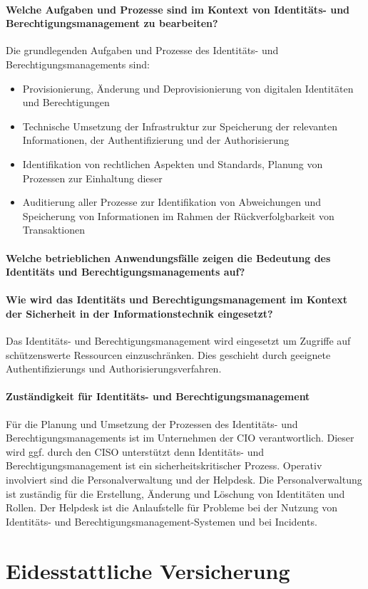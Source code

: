 \documentclass[11pt]{article}
\begin{document}
\paragraph{Welche Aufgaben und Prozesse sind im Kontext von Identitäts- und Berechtigungsmanagement zu bearbeiten?}
Die grundlegenden Aufgaben und Prozesse des Identitäts- und Berechtigungsmanagements sind:
\begin{itemize}
  \item Provisionierung, Änderung und Deprovisionierung von digitalen Identitäten und Berechtigungen
  \item Technische Umsetzung der Infrastruktur zur Speicherung der relevanten Informationen, der Authentifizierung und der Authorisierung
  \item Identifikation von rechtlichen Aspekten und Standards, Planung von Prozessen zur Einhaltung dieser
  \item Auditierung aller Prozesse zur Identifikation von Abweichungen und Speicherung von Informationen im Rahmen der Rückverfolgbarkeit von Transaktionen
\end{itemize}
\paragraph{Welche betrieblichen Anwendungsfälle zeigen die Bedeutung des Identitäts und Berechtigungsmanagements auf?}
\paragraph{Wie wird das Identitäts und Berechtigungsmanagement im Kontext der Sicherheit in der Informationstechnik eingesetzt?}
Das Identitäts- und Berechtigungsmanagement wird eingesetzt um Zugriffe auf schützenswerte Ressourcen einzuschränken. Dies geschieht durch geeignete Authentifizierungs und Authorisierungsverfahren.
\paragraph{Zuständigkeit für Identitäts- und Berechtigungsmanagement}
Für die Planung und Umsetzung der Prozessen des Identitäts- und Berechtigungsmanagements ist im Unternehmen der CIO verantwortlich. Dieser wird ggf. durch den CISO unterstützt denn Identitäts- und Berechtigungsmanagement ist ein sicherheitskritischer Prozess. Operativ involviert sind die Personalverwaltung und der Helpdesk. Die Personalverwaltung ist zuständig für die Erstellung, Änderung und Löschung von Identitäten und Rollen. Der Helpdesk ist die Anlaufstelle für Probleme bei der Nutzung von Identitäts- und Berechtigungsmanagement-Systemen und bei Incidents.
\newpage
\section{Eidesstattliche Versicherung}
\newpage
\printbibliography[notkeyword={quelle}, title={Literaturverzeichnis}]
\newpage
\printbibliography[keyword={quelle}, title={Quellenverzeichnis}]
\newpage
\listoffigures
\end{document}

